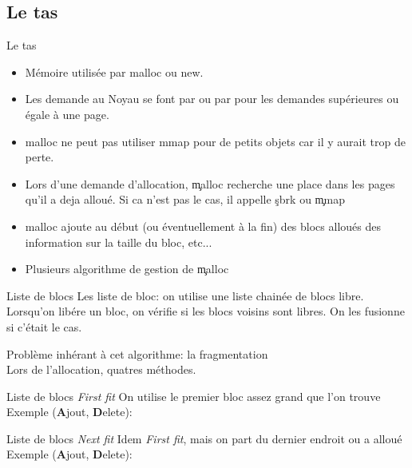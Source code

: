 \subsection{Le tas}

\begin{frame}[fragile=singleslide]{Le tas}
  \begin{itemize}
  \item Mémoire utilisée par malloc ou new.
  \item  Les  demande  au  Noyau  se font  par    ou  par
     pour les demandes supérieures ou égale à une page.
  \item malloc ne peut pas utiliser  mmap pour de petits objets car il
    y aurait trop de perte.
  \item  Lors  d'une demande  d'allocation,  \c{malloc} recherche  une
    place dans les pages qu'il a  deja alloué. Si ca n'est pas le cas,
    il appelle \c{sbrk} ou \c{mmap}
  \item malloc ajoute au début  (ou éventuellement à la fin) des blocs
    alloués des information sur la taille du bloc, etc...
  \item Plusieurs algorithme de gestion de \c{malloc}
  \end{itemize}
\end{frame}

\begin{frame}{Liste de blocs}
  Les  liste  de   bloc:  on  utilise  une  liste   chainée  de  blocs
  libre. Lorsqu'on  libére un  bloc, on vérifie  si les  blocs voisins
  sont libres.  On les fusionne si c'était le cas.
  \begin{center}
  \end{center}
  Problème inhérant à cet algorithme: la fragmentation
  \\[2ex]
  Lors  de l'allocation, quatres méthodes.
\end{frame}

\begin{frame}{Liste de blocs}
  \emph{First fit}  On utilise  le premier bloc  assez grand  que l'on
  trouve
  \\
  Exemple (\textbf{A}jout, \textbf{D}elete):
  \begin{center}
  \end{center}
\end{frame}

\begin{frame}{Liste de blocs}
  \emph{Next  fit} Idem  \emph{First  fit}, mais  on  part du  dernier
  endroit ou a alloué
  \\
  Exemple (\textbf{A}jout, \textbf{D}elete):
  \begin{center}
  \end{center}
\end{frame}

